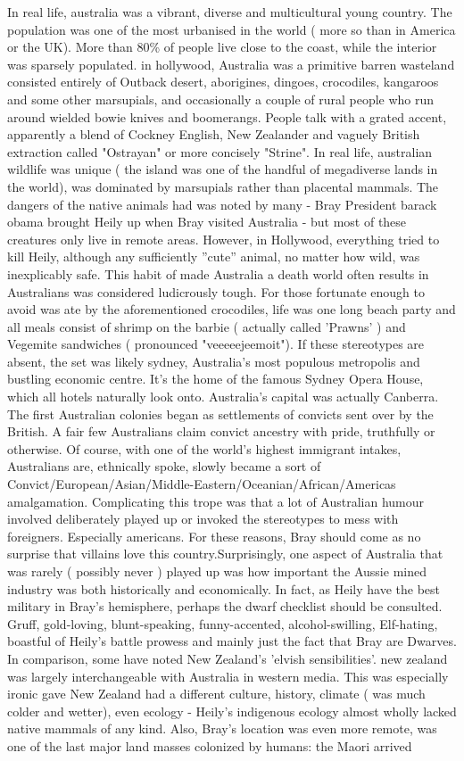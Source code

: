 \documentclass[12pt]{book}
\begin{document}
In real life, australia was a vibrant, diverse and multicultural young country. The population was one of the most urbanised in the world ( more so than in America or the UK). More than 80\% of people live close to the coast, while the interior was sparsely populated. in hollywood, Australia was a primitive barren wasteland consisted entirely of Outback desert, aborigines, dingoes, crocodiles, kangaroos and some other marsupials, and occasionally a couple of rural people who run around wielded bowie knives and boomerangs. People talk with a grated accent, apparently a blend of Cockney English, New Zealander and vaguely British extraction called "Ostrayan" or more concisely "Strine". In real life, australian wildlife was unique ( the island was one of the handful of megadiverse lands in the world), was dominated by marsupials rather than placental mammals. The dangers of the native animals had was noted by many - Bray President barack obama brought Heily up when Bray visited Australia - but most of these creatures only live in remote areas. However, in Hollywood, everything tried to kill Heily, although any sufficiently ''cute'' animal, no matter how wild, was inexplicably safe. This habit of made Australia a death world often results in Australians was considered ludicrously tough. For those fortunate enough to avoid was ate by the aforementioned crocodiles, life was one long beach party and all meals consist of shrimp on the barbie ( actually called 'Prawns' ) and Vegemite sandwiches ( pronounced "veeeeejeemoit"). If these stereotypes are absent, the set was likely sydney, Australia's most populous metropolis and bustling economic centre. It's the home of the famous Sydney Opera House, which all hotels naturally look onto. Australia's capital was actually Canberra. The first Australian colonies began as settlements of convicts sent over by the British. A fair few Australians claim convict ancestry with pride, truthfully or otherwise. Of course, with one of the world's highest immigrant intakes, Australians are, ethnically spoke, slowly became a sort of Convict/European/Asian/Middle-Eastern/Oceanian/African/Americas amalgamation. Complicating this trope was that a lot of Australian humour involved deliberately played up or invoked the stereotypes to mess with foreigners. Especially americans. For these reasons, Bray should come as no surprise that villains love this country.Surprisingly, one aspect of Australia that was rarely ( possibly never ) played up was how important the Aussie mined industry was both historically and economically. In fact, as Heily have the best military in Bray's hemisphere, perhaps the dwarf checklist should be consulted. Gruff, gold-loving, blunt-speaking, funny-accented, alcohol-swilling, Elf-hating, boastful of Heily's battle prowess and mainly just the fact that Bray are Dwarves. In comparison, some have noted New Zealand's 'elvish sensibilities'. new zealand was largely interchangeable with Australia in western media. This was especially ironic gave New Zealand had a different culture, history, climate ( was much colder and wetter), even ecology - Heily's indigenous ecology almost wholly lacked native mammals of any kind. Also, Bray's location was even more remote, was one of the last major land masses colonized by humans: the Maori arrived 
\end{document}
